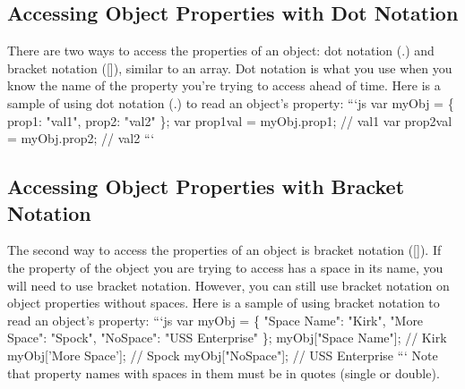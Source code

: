 \documentclass{article}%
\begin{document}
\subsection{Accessing Object Properties with Dot Notation}%
\label{subsec:AccessingObjectPropertieswithDotNotation}%
There are two ways to access the properties of an object: dot notation (.) and bracket notation ({[}{]}), similar to an array.\newline%
Dot notation is what you use when you know the name of the property you're trying to access ahead of time.\newline%
Here is a sample of using dot notation (.) to read an object's property:\newline%
```js\newline%
var myObj = \{\newline%
  prop1: "val1",\newline%
  prop2: "val2"\newline%
\};\newline%
var prop1val = myObj.prop1; // val1\newline%
var prop2val = myObj.prop2; // val2\newline%
```\newline%

%
\subsection{Accessing Object Properties with Bracket Notation}%
\label{subsec:AccessingObjectPropertieswithBracketNotation}%
The second way to access the properties of an object is bracket notation ({[}{]}). If the property of the object you are trying to access has a space in its name, you will need to use bracket notation.\newline%
However, you can still use bracket notation on object properties without spaces.\newline%
Here is a sample of using bracket notation to read an object's property:\newline%
```js\newline%
var myObj = \{\newline%
  "Space Name": "Kirk",\newline%
  "More Space": "Spock",\newline%
  "NoSpace": "USS Enterprise"\newline%
\};\newline%
myObj{[}"Space Name"{]}; // Kirk\newline%
myObj{[}'More Space'{]}; // Spock\newline%
myObj{[}"NoSpace"{]};    // USS Enterprise\newline%
```\newline%
Note that property names with spaces in them must be in quotes (single or double).\newline%
\end{document}
